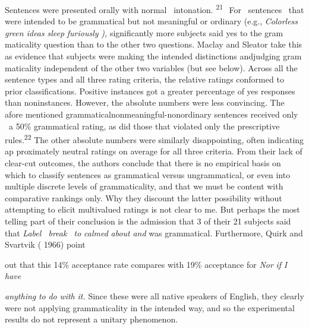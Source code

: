 \clearpage\setcounter{page}{1}\begin{styleStandard}
Sentences were presented orally with normal \ intonation. \textsuperscript{21 }\textsuperscript{\ }For \ sentences \ that were intended to be grammatical but not meaningful or ordinary (e.g., \textit{Colorless}\textit{ }\textit{green ideas}\textit{ }\textit{sleep}\textit{ }\textit{furiously}\textit{ }\textit{),}\textit{ }significantly more subjects said {\textquotedbl}yes{\textquotedbl} to the gram\- maticality question than to the other two questions. Maclay and Sleator take this as evidence that subjects were making the intended distinctions andjudging gram\- maticality independent of the other two variables (but see below). Across all the sentence types and all three rating criteria, the relative ratings conformed to prior classifications. Positive instances got a greater percentage of {\textquotedbl}yes{\textquotedbl} responses than noninstances. However, the absolute numbers were less convincing. The afore\- mentioned grammatical{\textquotedbl}nonmeaningful-nonordinary sentences received only \ a 50\% grammatical rating, as did those that violated only the prescriptive rules.\textsuperscript{22}\textsuperscript{ }The other absolute numbers were similarly disappointing, often indicating ap\- proximately neutral ratings on average for all three criteria. From their lack of clear-cut outcomes, the authors conclude that there is no empirical basis on which to classify sentences as grammatical versus ungrammatical, or even into multiple discrete levels of grammaticality, and that we must be content with comparative rankings only. Why they discount the latter possibility without attempting to elicit multivalued ratings is not clear to me. But perhaps the most telling part of their conclusion is the admission that 3 of their 21 subjects said that \textit{Label \ break \ to}\textit{ }\textit{calmed}\textit{ }\textit{about}\textit{ }\textit{and}\textit{ }was grammatical. Furthermore, Quirk and Svartvik ( 1966) point
\end{styleStandard}


\begin{styleStandard}
out that this 14\% acceptance rate compares with 19\% acceptance for \textit{Nor}\textit{ }\textit{if}\textit{ }\textit{I}\textit{ }\textit{have}
\end{styleStandard}


\begin{styleStandard}
\textit{anything}\textit{ }\textit{to}\textit{ }\textit{do}\textit{ }\textit{with}\textit{ }\textit{it.}\textit{ }Since these were all native speakers of English, they clearly were not applying grammaticality in the intended way, and so the experimental results do not represent a unitary phenomenon.
\end{styleStandard}


